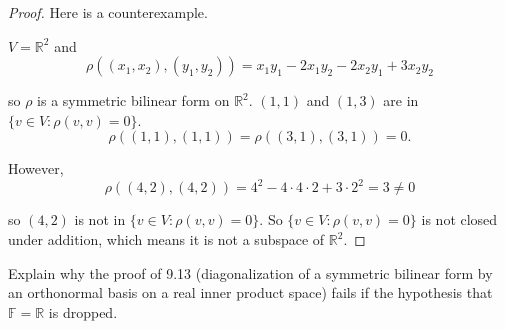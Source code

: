 \begin{proof}
    Here is a counterexample.

    $V = \mathbb{R}^{2}$ and
    \[
        \rho((x_{1}, x_{2}), (y_{1}, y_{2})) = x_{1}y_{1} - 2x_{1}y_{2} - 2x_{2}y_{1} + 3x_{2}y_{2}
    \]

    so $\rho$ is a symmetric bilinear form on $\mathbb{R}^{2}$. $(1, 1)$ and $(1, 3)$ are in $\{ v\in V : \rho(v, v) = 0 \}$.
    \[
        \rho((1, 1), (1, 1)) = \rho((3, 1), (3, 1)) = 0.
    \]

    However,
    \[
        \rho((4, 2), (4, 2)) = 4^{2} - 4\cdot 4\cdot 2 + 3\cdot 2^{2} = 3\ne 0
    \]

    so $(4, 2)$ is not in $\{ v\in V : \rho(v, v) = 0 \}$. So $\{ v\in V : \rho(v, v) = 0 \}$ is not closed under addition, which means it is not a subspace of $\mathbb{R}^{2}$.
\end{proof}
\newpage

\begin{exercise}\label{chapter9:sectionA:exercise7}
    Explain why the proof of 9.13 (diagonalization of a symmetric bilinear form by an orthonormal basis on a real inner product space) fails if the hypothesis that $\mathbb{F} = \mathbb{R}$ is dropped.
\end{exercise}

